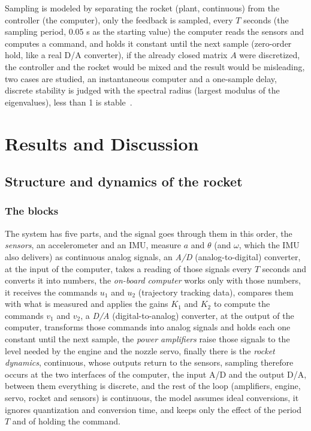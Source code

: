 \documentclass[article, 11pt]{IEEEtran}   %
\begin{document}
Sampling is modeled by separating the rocket (plant, continuous) from the controller (the computer), only the feedback is sampled, every $T$ seconds (the sampling period, 0.05 s as the starting value) the computer reads the sensors and computes a command, and holds it constant until the next sample (zero-order hold, like a real D/A converter), if the already closed matrix $A$ were discretized, the controller and the rocket would be mixed and the result would be misleading, two cases are studied, an instantaneous computer and a one-sample delay, discrete stability is judged with the spectral radius (largest modulus of the eigenvalues), less than 1 is stable~\cite{franklin}.

\section{Results and Discussion}

\subsection{Structure and dynamics of the rocket}
\subsubsection{The blocks}
The system has five parts, and the signal goes through them in this order, the \emph{sensors}, an accelerometer and an IMU, measure $a$ and $\theta$ (and $\omega$, which the IMU also delivers) as continuous analog signals, an \emph{A/D} (analog-to-digital) converter, at the input of the computer, takes a reading of those signals every $T$ seconds and converts it into numbers, the \emph{on-board computer} works only with those numbers, it receives the commands $u_1$ and $u_2$ (trajectory tracking data), compares them with what is measured and applies the gains $K_1$ and $K_2$ to compute the commands $v_1$ and $v_2$, a \emph{D/A} (digital-to-analog) converter, at the output of the computer, transforms those commands into analog signals and holds each one constant until the next sample, the \emph{power amplifiers} raise those signals to the level needed by the engine and the nozzle servo, finally there is the \emph{rocket dynamics}, continuous, whose outputs return to the sensors, sampling therefore occurs at the two interfaces of the computer, the input A/D and the output D/A, between them everything is discrete, and the rest of the loop (amplifiers, engine, servo, rocket and sensors) is continuous, the model assumes ideal conversions, it ignores quantization and conversion time, and keeps only the effect of the period $T$ and of holding the command.
\end{document}

